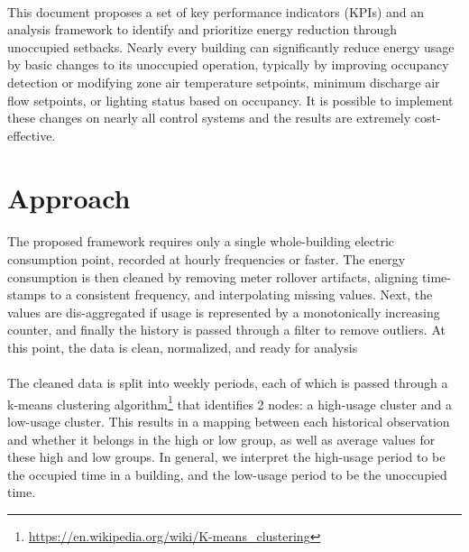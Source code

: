 \documentclass[a4paper]{article}
\begin{document}
\paragraph{}
This document proposes a set of key performance indicators (KPIs) and an analysis framework to identify and prioritize energy reduction through unoccupied setbacks. Nearly every building can significantly reduce energy usage by basic changes to its unoccupied operation, typically by improving occupancy detection or modifying zone air temperature setpoints, minimum discharge air flow setpoints, or lighting status based on occupancy. It is possible to implement these changes on nearly all control systems and the results are extremely cost-effective.

\section{Approach}

\paragraph{}
The proposed framework requires only a single whole-building electric consumption point, recorded at hourly frequencies or faster. The energy consumption is then cleaned by removing meter rollover artifacts, aligning time-stamps to a consistent frequency, and interpolating missing values. Next, the values are dis-aggregated if usage is represented by a monotonically increasing counter, and finally the history is passed through a filter to remove outliers. At this point, the data is clean, normalized, and ready for analysis

\paragraph{}
The cleaned data is split into weekly periods, each of which is passed through a k-means clustering algorithm\footnote{\url{https://en.wikipedia.org/wiki/K-means\_clustering}} that identifies 2 nodes: a high-usage cluster and a low-usage cluster. This results in a mapping between each historical observation and whether it belongs in the high or low group, as well as average values for these high and low groups. In general, we interpret the high-usage period to be the occupied time in a building, and the low-usage period to be the unoccupied time.
\end{document}
